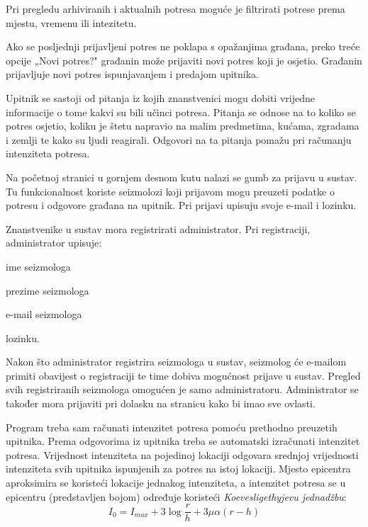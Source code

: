 {	Pri pregledu arhiviranih i aktualnih potresa moguće je filtrirati potrese prema mjestu, vremenu ili intezitetu. 
	
	Ako se posljednji prijavljeni potres ne poklapa s opažanjima građana, preko treće opcije „Novi potres?" građanin može prijaviti novi potres koji je osjetio. Građanin prijavljuje novi potres ispunjavanjem i predajom upitnika.
	
	Upitnik se sastoji od pitanja iz kojih znanstvenici mogu dobiti vrijedne informacije o tome kakvi su bili učinci potresa. 
	Pitanja se odnose na to koliko se potres osjetio, koliku je štetu napravio na malim predmetima, kućama, zgradama i zemlji te kako su ljudi reagirali. 
	Odgovori na ta pitanja pomažu pri računanju intenziteta potresa.
	
	Na početnoj stranici u gornjem desnom kutu nalazi se gumb za prijavu u sustav. Tu funkcionalnost koriste seizmolozi koji prijavom mogu preuzeti podatke o potresu i odgovore građana na upitnik.  Pri prijavi upisuju svoje e-mail i lozinku.
	 
	Znanstvenike u sustav mora registrirati administrator. Pri registraciji, administrator upisuje:
	\begin{packed_item}
		\item ime seizmologa
		\item prezime seizmologa
		\item e-mail seizmologa
		\item lozinku.
	\end{packed_item}
	Nakon što administrator registrira seizmologa u sustav, seizmolog će e-mailom primiti obavijest o registraciji te time dobiva mogućnost prijave u sustav.
	Pregled svih registriranih seizmologa omogućen je samo administratoru.
	Administrator se također mora prijaviti pri dolasku na stranicu kako bi imao sve ovlasti. \\
	
	}
	
	Program treba sam računati intenzitet potresa pomoću prethodno preuzetih upitnika. Prema odgovorima iz upitnika treba se automatski izračunati intenzitet potresa. 
	Vrijednost intenziteta na pojedinoj lokaciji odgovara srednjoj vrijednosti intenziteta svih upitnika ispunjenih za potres na istoj lokaciji. Mjesto epicentra aproksimira se koristeći lokacije jednakog intenziteta, a intenzitet potresa se u epicentru (predstavljen bojom) određuje koristeći \textit{Koevesligethyjevu jednadžbu}:
\begin{equation}
  I_{0} = I_{max} + 3\log\frac{r}{h} + 3\mu\alpha(r-h)
\end{equation}

